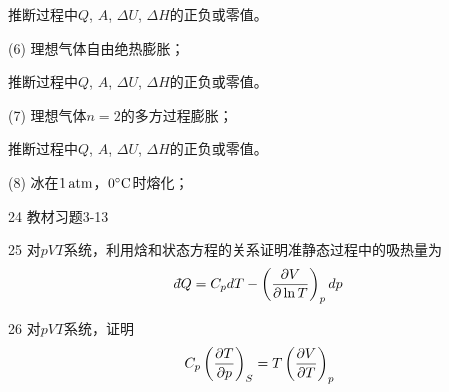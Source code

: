 \documentclass[CJK]{beamer}
\begin{document}
\begin{frame}
\bch


推断过程中$Q$, $A$, $\Delta U$, $\Delta H$的正负或零值。

\bitem
\item[(6)]{理想气体自由绝热膨胀；}
\eitem

\ech
\end{frame}


\begin{frame}
\bch


推断过程中$Q$, $A$, $\Delta U$, $\Delta H$的正负或零值。

\bitem
\item[(7)]{理想气体$n=2$的多方过程膨胀；}
\eitem

\ech
\end{frame}

\begin{frame}
\bch


推断过程中$Q$, $A$, $\Delta U$, $\Delta H$的正负或零值。

\bitem
\item[(8)]{冰在$1\,\mathrm{atm}$，$0^\circ \mathrm{C}$时熔化；}
\eitem

\ech
\end{frame}


\begin{frame}
\bch
\bitem
\item[24]{ 教材习题3-13}
\item[25]{ 对$pVT$系统，利用焓和状态方程的关系证明准静态过程中的吸热量为
$$ \dbar Q = C_p dT - \pfrac V{\ln T}p dp$$}
\item[26]{ 对$pVT$系统，证明
$$C_p \left(\frac{\partial T}{\partial p}\right)_{S} = T \left(\frac{\partial V}{\partial T}\right)_{p} $$ }
\eitem
\ech
\end{frame}
\end{document}
